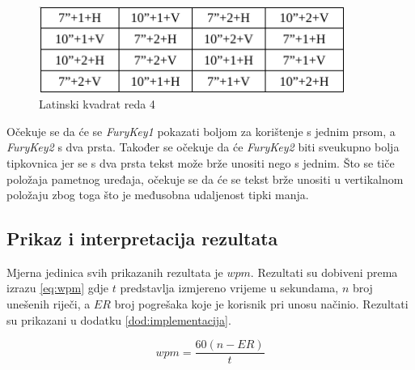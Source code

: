 \documentclass[times, utf8, zavrsni, numeric]{fer}
\begin{document}
\begin{figure}[htb]
\centering
\includegraphics[width=10cm]{img/lat.png}
\caption{Latinski kvadrat reda 4}
\label{fig:lat}
\end{figure}

Očekuje se da će se \emph{FuryKey1} pokazati boljom za korištenje s jednim prsom, a \emph{FuryKey2} s dva prsta. Također se očekuje da će \emph{FuryKey2} biti sveukupno bolja tipkovnica jer se s dva prsta tekst može brže unositi nego s jednim. Što se tiče položaja pametnog uređaja, očekuje se da će se tekst brže unositi u vertikalnom položaju zbog toga što je međusobna udaljenost tipki manja.

\subsection{Prikaz i interpretacija rezultata}
Mjerna jedinica svih prikazanih rezultata je $wpm$. Rezultati su dobiveni prema izrazu \ref{eq:wpm} gdje $t$ predstavlja izmjereno vrijeme u sekundama, $n$ broj unešenih riječi, a $ER$ broj pogrešaka koje je korisnik pri unosu načinio. Rezultati su prikazani u dodatku \ref{dod:implementacija}.

\begin{equation}
\label{eq:wpm}
wpm = \frac{60(n-ER)}{t}
\end{equation}
\end{document}
